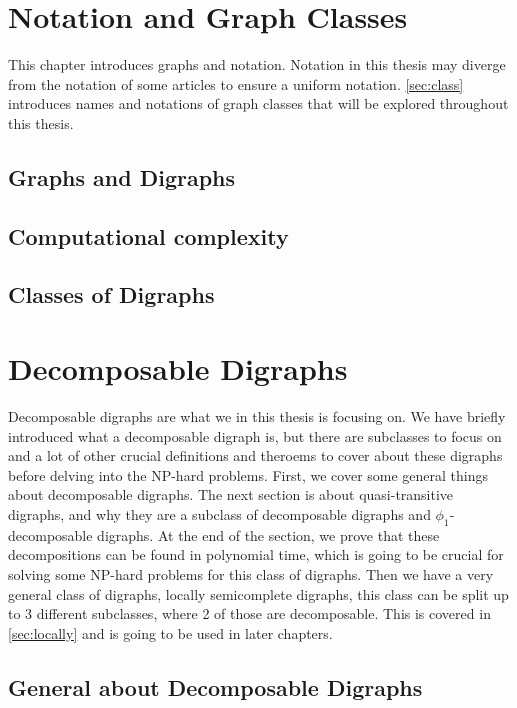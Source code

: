 
\chapter{Notation and Graph Classes}
This chapter introduces graphs and notation. 
Notation in this thesis may diverge from the notation of some articles to ensure a uniform notation.  \autoref{sec:class} introduces names and notations of graph classes that will be explored throughout this thesis.
\label{chap:intro}
\section{Graphs and Digraphs}
\label{sec:digraph}

\section{Computational complexity}
\label{sec:complexity}

\section{Classes of Digraphs}
\label{sec:class}


\chapter{Decomposable Digraphs}
\label{chap:decomposable}
Decomposable digraphs are what we in this thesis is focusing on. 
We have briefly introduced what a decomposable digraph is, but there are subclasses to focus on and a lot of other crucial definitions and theroems to cover about these digraphs before delving into the NP-hard problems. 
First, we cover some general things about decomposable digraphs. 
The next section is about quasi-transitive digraphs, and why they are a subclass of decomposable digraphs and $\phi_1$-decomposable digraphs. 
At the end of the section, we prove that these decompositions can be found in polynomial time, which is going to be crucial for solving some NP-hard problems for this class of digraphs. 
Then we have a very general class of digraphs, locally semicomplete digraphs, this class can be split up to 3 different subclasses, where 2 of those are decomposable. 
This is covered in \autoref{sec:locally} and is going to be used in later chapters. 
\section{General about Decomposable Digraphs}
\label{sec:gdecomposable}

